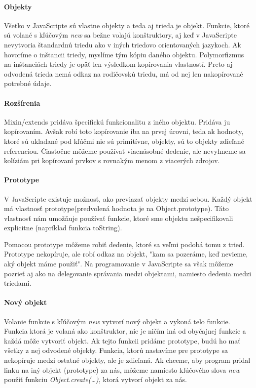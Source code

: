 \paragraph{Objekty}
Všetko v JavaScripte sú vlastne objekty a teda aj trieda je objekt. Funkcie, ktoré sú volané s kľúčovým \emph{new} sa bežne volajú konštruktory, aj keď v JavaScripte nevytvoria štandardnú triedu ako v iných triedovo orientovaných jazykoch. 
Ak hovoríme o inštancii triedy, myslíme tým kópiu daného objektu. Polymorfizmus na inštanciách triedy je opäť len výsledkom kopírovania vlastností. Preto aj odvodená trieda nemá odkaz na rodičovskú triedu, má od nej len nakopírované potrebné údaje.

\paragraph{Rozšírenia}
Mixin/extends pridáva špecifickú funkcionalitu z iného objektu. Pridáva ju kopírovaním. Avšak robí toto kopírovanie iba na prvej úrovni, teda ak hodnoty, ktoré sú ukladané pod kľúčmi nie sú primitívne, objekty, sú to objekty zdieľané referenciou. Čiastočne môžeme používať viacnásobné dedenie, ale nevyhneme sa kolíziám pri kopírovaní prvkov s rovnakým menom z viacerých zdrojov.

\paragraph{Prototype}
V JavaScripte existuje možnosť, ako previazať objekty medzi sebou. Každý objekt má vlastnosť prototype(predvolená hodnota je na Object.prototype). Táto vlastnosť nám umožňuje používať funkcie, ktoré sme objektu nešpecifikovali explicitne (napríklad funkcia toString).

Pomocou prototype môžeme robiť dedenie, ktoré sa veľmi podobá tomu z tried. Prototype nekopíruje, ale robí odkaz na objekt, "kam sa pozeráme, keď nevieme, aký objekt máme použiť".
Na programovanie v JavaScripte sa však môžeme pozrieť aj ako na delegovanie správania medzi objektami, namiesto dedenia medzi triedami.

\paragraph{Nový objekt}
Volanie funkcie s kľúčovým \emph{new} vytvorí nový objekt a vykoná telo funkcie. Funkcia ktorá je volaná ako konštruktor, nie je ničím iná od obyčajnej funkcie a každá môže vytvoriť objekt.
Ak tejto funkcii pridáme prototype, budú ho mať všetky z nej odvodené objekty. Funkcia, ktorú nastavíme pre prototype sa nekopíruje medzi ostatné objekty, ale je zdieľaná.
Ak chceme, aby program pridal linku na iný objekt (prototype) za nás, môžeme namiesto kľúčového slova \emph{new} použiť funkciu \emph{Object.create(\ldots)}, ktorá vytvorí objekt za nás.

